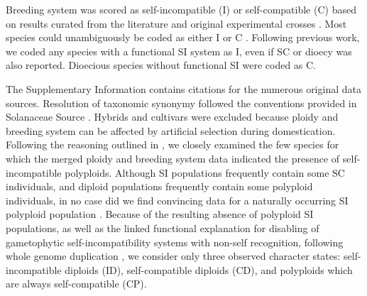 Breeding system was scored as self-incompatible (I) or self-compatible (C) based on results curated from the literature and  original experimental crosses \citep[as compiled in][]{igic_2006, goldberg_2010, robertson_2011, goldberg_2012}.
Most species could unambiguously be coded as either I or C \citep{raduski_2012}.
Following previous work, we coded any species with a functional SI system as I, even if SC or dioecy was also reported.
Dioecious species without functional SI were coded as C.

The Supplementary Information contains citations for the numerous original data sources. %
Resolution of taxonomic synonymy followed the conventions provided in Solanaceae Source \citep{solsource}. 
Hybrids and cultivars were excluded because ploidy and breeding system can be affected by artificial selection during domestication.
Following the reasoning outlined in \citet{robertson_2011}, we closely examined the few species for which the merged ploidy and breeding system data indicated the presence of self-incompatible polyploids.
Although SI populations frequently contain some SC individuals, and diploid populations frequently contain some polyploid individuals, in no case did we find convincing data for a naturally occurring SI polyploid population  \citep[discussed in][]{robertson_2011}.
Because of the resulting absence of polyploid SI populations, as well as the linked functional explanation for disabling of gametophytic self-incompatibility systems with non-self recognition, following whole genome duplication \citep[reviewed in][]{ramsey_1998,stone_2002}, we consider only three observed character states: self-incompatible diploids (ID), self-compatible diploids (CD), and polyploids which are always self-compatible (CP).


